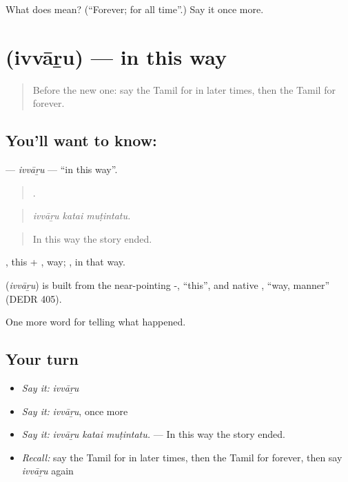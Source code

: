 \begin{tcolorbox}[breakable,colback=teal!4,colframe=teal!35!black,title={Before you move on}]
What does  mean? (\textquotedblleft{}Forever; for all time\textquotedblright{}.) Say it once more.
\end{tcolorbox}
\section[\texorpdfstring{\ta{இவ்வாறு} (ivvāṟu)}{இவ்வாறு (ivvāṟu)}]{ (ivvāṟu) — in this way}

\label{lesson:TA-C346-ivvaru}



\begin{quote}
Before the new one: say the Tamil for in later times, then the Tamil for forever.
\end{quote}

\subsection*{You'll want to know: }
\textbf{} — \emph{ivvāṟu} — \textquotedblleft{}in this way\textquotedblright{}.

\begin{quote}
  .
\end{quote}

\begin{quote}
\emph{ivvāṟu katai muṭintatu.}
\end{quote}

\begin{quote}
In this way the story ended.
\end{quote}

, this + , way; , in that way.

\begin{cousinweb}
\textbf{} (\emph{ivvāṟu}) is built from the near-pointing -, \textquotedblleft{}this\textquotedblright{}, and native , \textquotedblleft{}way, manner\textquotedblright{} (DEDR 405).
\end{cousinweb}

\begin{grammarlens}[title={What you've built}]
One more word for telling what happened.
\end{grammarlens}

\subsection*{Your turn}
\begin{itemize}
\raggedright
  \item \emph{Say it:} \emph{ivvāṟu}
  \item \emph{Say it:} \emph{ivvāṟu}, once more
  \item \emph{Say it:} \emph{ivvāṟu katai muṭintatu.} — In this way the story ended.
  \item \emph{Recall:} say the Tamil for in later times, then the Tamil for forever, then say \emph{ivvāṟu} again
\end{itemize}

